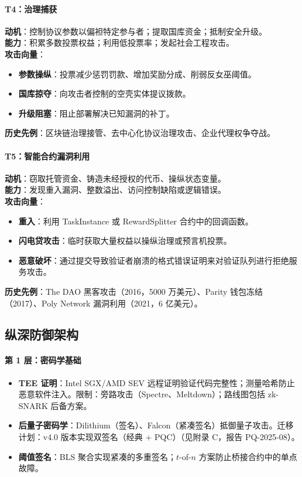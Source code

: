 \documentclass[11pt]{article}
\begin{document}
\paragraph{T4：治理捕获}
\textbf{动机}：控制协议参数以偏袒特定参与者；提取国库资金；抵制安全升级。\\
\textbf{能力}：积累多数投票权益；利用低投票率；发起社会工程攻击。\\
\textbf{攻击向量}：
\begin{itemize}[noitemsep]
  \item \textbf{参数操纵}：投票减少惩罚罚款、增加奖励分成、削弱反女巫阈值。
  \item \textbf{国库掠夺}：向攻击者控制的空壳实体提议拨款。
  \item \textbf{升级阻塞}：阻止部署解决已知漏洞的补丁。
\end{itemize}
\textbf{历史先例}：区块链治理接管、去中心化协议治理攻击、企业代理权争夺战。

\paragraph{T5：智能合约漏洞利用}
\textbf{动机}：窃取托管资金、铸造未经授权的代币、操纵状态变量。\\
\textbf{能力}：发现重入漏洞、整数溢出、访问控制缺陷或逻辑错误。\\
\textbf{攻击向量}：
\begin{itemize}[noitemsep]
  \item \textbf{重入}：利用 TaskInstance 或 RewardSplitter 合约中的回调函数。
  \item \textbf{闪电贷攻击}：临时获取大量权益以操纵治理或预言机投票。
  \item \textbf{恶意破坏}：通过提交导致验证者崩溃的格式错误证明来对验证队列进行拒绝服务攻击。
\end{itemize}
\textbf{历史先例}：The DAO 黑客攻击（2016，5000 万美元）、Parity 钱包冻结（2017）、Poly Network 漏洞利用（2021，6 亿美元）。

\subsection{纵深防御架构}

\paragraph{第 1 层：密码学基础}
\begin{itemize}[noitemsep]
  \item \textbf{TEE 证明}：Intel SGX/AMD SEV 远程证明验证代码完整性；测量哈希防止恶意软件注入。限制：旁路攻击（Spectre、Meltdown）；路线图包括 zk-SNARK 后备方案。
  \item \textbf{后量子密码学}：Dilithium（签名）、Falcon（紧凑签名）抵御量子攻击。迁移计划：v4.0 版本实现双签名（经典 + PQC）（见附录 C，报告 PQ-2025-08）。
  \item \textbf{阈值签名}：BLS 聚合实现紧凑的多重签名；$t$-of-$n$ 方案防止桥接合约中的单点故障。
\end{itemize}
\end{document}
